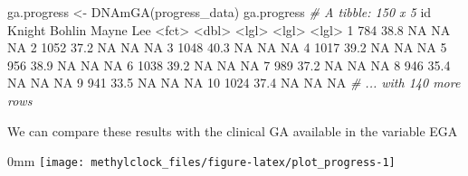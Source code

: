 \documentclass[]{article}
\newcommand{\hlnum}[1]{\textcolor[rgb]{0.816,0.125,0.439}{#1}}%
\newcommand{\hlstr}[1]{\textcolor[rgb]{0.251,0.627,0.251}{#1}}%
\newcommand{\hlcom}[1]{\textcolor[rgb]{0.502,0.502,0.502}{\textit{#1}}}%
\newcommand{\hlopt}[1]{\textcolor[rgb]{0,0,0}{#1}}%
\newcommand{\hlstd}[1]{\textcolor[rgb]{0.251,0.251,0.251}{#1}}%
\newcommand{\hlkwc}[1]{\textcolor[rgb]{0.251,0.251,0.251}{#1}}%
\newcommand{\hlkwd}[1]{\textcolor[rgb]{0.878,0.439,0.125}{#1}}%
\newenvironment{Shaded}{\begin{myshaded}}{\end{myshaded}}
\newcommand{\KeywordTok}[1]{\hlkwd{#1}}
\newcommand{\DataTypeTok}[1]{\hlkwc{#1}}
\newcommand{\DecValTok}[1]{\hlnum{#1}}
\newcommand{\FloatTok}[1]{\hlnum{#1}}
\newcommand{\StringTok}[1]{\hlstr{#1}}
\newcommand{\CommentTok}[1]{\hlcom{#1}}
\newcommand{\OtherTok}[1]{{#1}}
\newcommand{\OperatorTok}[1]{\hlopt{#1}}
\newcommand{\ErrorTok}[1]{\textcolor{errorcolor}{#1}}
\newcommand{\NormalTok}[1]{\hlstd{#1}}
\begin{document}
\begin{Shaded}
\begin{Highlighting}[]
\NormalTok{ga.progress <-}\StringTok{ }\KeywordTok{DNAmGA}\NormalTok{(progress_data)}
\NormalTok{ga.progress}
  \CommentTok{# A tibble: 150 x 5}
\NormalTok{     id    Knight Bohlin Mayne Lee  }
     \OperatorTok{<}\NormalTok{fct}\OperatorTok{>}\StringTok{  }\ErrorTok{<}\NormalTok{dbl}\OperatorTok{>}\StringTok{ }\ErrorTok{<}\NormalTok{lgl}\OperatorTok{>}\StringTok{  }\ErrorTok{<}\NormalTok{lgl}\OperatorTok{>}\StringTok{ }\ErrorTok{<}\NormalTok{lgl}\OperatorTok{>}
\StringTok{   }\DecValTok{1} \DecValTok{784}     \FloatTok{38.8} \OtherTok{NA}     \OtherTok{NA}    \OtherTok{NA}   
   \DecValTok{2} \DecValTok{1052}    \FloatTok{37.2} \OtherTok{NA}     \OtherTok{NA}    \OtherTok{NA}   
   \DecValTok{3} \DecValTok{1048}    \FloatTok{40.3} \OtherTok{NA}     \OtherTok{NA}    \OtherTok{NA}   
   \DecValTok{4} \DecValTok{1017}    \FloatTok{39.2} \OtherTok{NA}     \OtherTok{NA}    \OtherTok{NA}   
   \DecValTok{5} \DecValTok{956}     \FloatTok{38.9} \OtherTok{NA}     \OtherTok{NA}    \OtherTok{NA}   
   \DecValTok{6} \DecValTok{1038}    \FloatTok{39.2} \OtherTok{NA}     \OtherTok{NA}    \OtherTok{NA}   
   \DecValTok{7} \DecValTok{989}     \FloatTok{37.2} \OtherTok{NA}     \OtherTok{NA}    \OtherTok{NA}   
   \DecValTok{8} \DecValTok{946}     \FloatTok{35.4} \OtherTok{NA}     \OtherTok{NA}    \OtherTok{NA}   
   \DecValTok{9} \DecValTok{941}     \FloatTok{33.5} \OtherTok{NA}     \OtherTok{NA}    \OtherTok{NA}   
  \DecValTok{10} \DecValTok{1024}    \FloatTok{37.4} \OtherTok{NA}     \OtherTok{NA}    \OtherTok{NA}   
  \CommentTok{# ... with 140 more rows}
\end{Highlighting}
\end{Shaded}

We can compare these results with the clinical GA available in the variable EGA

\begin{Shaded}
\end{Shaded}

\begin{adjustwidth}{\fltoffset}{0mm}
\texttt{[image: methylclock\_files/figure-latex/plot\_progress-1]} \end{adjustwidth}
\end{document}
